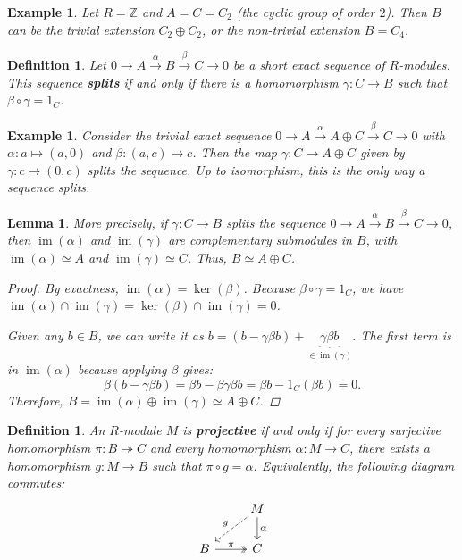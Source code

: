 \documentclass[a4paper,12pt]{article}
\newtheorem{lem}[thm]{Lemma}
\newtheorem{defn}[thm]{Definition}
\newtheorem{eg}[thm]{Example}
\begin{document}
\begin{eg}
    Let $R = \mathbb{Z}$ and $A = C = C_2$ (the cyclic group of order $2$). Then $B$ can be the trivial extension $C_2 \oplus C_2$, or the non-trivial extension $B = C_4$. 
\end{eg}

\begin{defn}
    Let $0 \to A \xrightarrow{\alpha} B \xrightarrow{\beta} C \to 0$ be a short exact sequence of $R$-modules. This sequence \textbf{splits} if and only if there is a homomorphism $\gamma: C \to B$ such that $\beta \circ \gamma = 1_C$. 
\end{defn}

\begin{eg}
    Consider the trivial exact sequence $0 \to A \xrightarrow{\alpha} A \oplus C \xrightarrow{\beta} C \to 0$ with $\alpha: a \mapsto (a,0)$ and $\beta: (a,c) \mapsto c$. Then the map $\gamma: C \to A \oplus C$ given by $\gamma: c \mapsto (0,c)$ splits the sequence. Up to isomorphism, this is the only way a sequence splits. 
\end{eg}

\begin{lem}
    More precisely, if $\gamma: C \to B$ splits the sequence $0 \to A \xrightarrow{\alpha} B \xrightarrow{\beta} C \to 0$, then $\operatorname{im}(\alpha)$ and $\operatorname{im}(\gamma)$ are complementary submodules in $B$, with $\operatorname{im}(\alpha) \simeq A$ and $\operatorname{im}(\gamma) \simeq C$. Thus, $B \simeq A \oplus C$.
    
    \begin{proof}
        By exactness, $\operatorname{im}(\alpha) = \ker(\beta)$. Because $\beta \circ \gamma = 1_C$, we have $\operatorname{im}(\alpha) \cap \operatorname{im}(\gamma) = \ker(\beta) \cap \operatorname{im}(\gamma) = 0$. 
        
        Given any $b \in B$, we can write it as $b = (b - \gamma\beta b) + \underbrace{\gamma\beta b}_{\in \operatorname{im}(\gamma)}$. The first term is in $\operatorname{im}(\alpha)$ because applying $\beta$ gives:
        $$
        \beta(b - \gamma\beta b) = \beta b - \beta\gamma\beta b = \beta b - 1_C(\beta b) = 0.
        $$
        Therefore, $B = \operatorname{im}(\alpha) \oplus \operatorname{im}(\gamma) \simeq A \oplus C$.
    \end{proof}
\end{lem}

\begin{defn}
    An $R$-module $M$ is \textbf{projective} if and only if for every surjective homomorphism $\pi: B \twoheadrightarrow C$ and every homomorphism $\alpha: M \to C$, there exists a homomorphism $g: M \to B$ such that $\pi \circ g = \alpha$. Equivalently, the following diagram commutes:
    $$
    \begin{tikzcd}
        & M \arrow[dl, "g"', dashed] \arrow[d, "\alpha"] \\
        B \arrow[r, "\pi", two heads] & C
    \end{tikzcd}
    $$
\end{defn}
\end{document}
